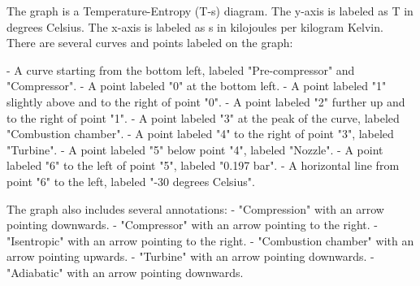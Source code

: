 The graph is a Temperature-Entropy (T-s) diagram. The y-axis is labeled as T in degrees Celsius. The x-axis is labeled as s in kilojoules per kilogram Kelvin. There are several curves and points labeled on the graph:

- A curve starting from the bottom left, labeled "Pre-compressor" and "Compressor".
- A point labeled "0" at the bottom left.
- A point labeled "1" slightly above and to the right of point "0".
- A point labeled "2" further up and to the right of point "1".
- A point labeled "3" at the peak of the curve, labeled "Combustion chamber".
- A point labeled "4" to the right of point "3", labeled "Turbine".
- A point labeled "5" below point "4", labeled "Nozzle".
- A point labeled "6" to the left of point "5", labeled "0.197 bar".
- A horizontal line from point "6" to the left, labeled "-30 degrees Celsius".

The graph also includes several annotations:
- "Compression" with an arrow pointing downwards.
- "Compressor" with an arrow pointing to the right.
- "Isentropic" with an arrow pointing to the right.
- "Combustion chamber" with an arrow pointing upwards.
- "Turbine" with an arrow pointing downwards.
- "Adiabatic" with an arrow pointing downwards.